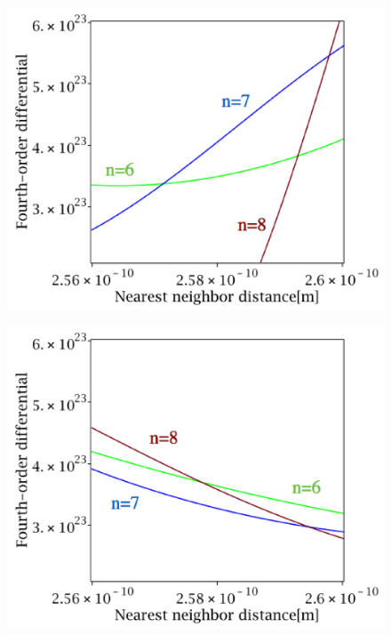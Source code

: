 \begin{figure}[htbp]
 \begin{minipage}[b]{0.5\linewidth}
  \centering
  \includegraphics[keepaspectratio, scale=0.41]
  {../image/fit1label.eps}
  \label{fit1}
 \end{minipage}
 \begin{minipage}[b]{0.5\linewidth}
  \centering
  \includegraphics[keepaspectratio, scale=0.41]
  {../image/fit2label.eps}
  \label{fit2}
 \end{minipage}

\end{figure}
